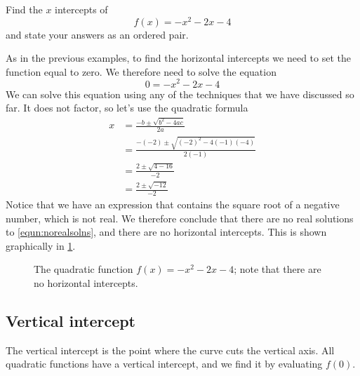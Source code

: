 \begin{myexample}\label{ex:horizints3}
Find the $x$ intercepts of 
\[
	f(x) = -x^2-2x-4
\]
and state your answers as an ordered pair.
\end{myexample}
\begin{myProof}
	As in the previous examples, to find the horizontal intercepts we need to set the function equal to zero. 
	We therefore need to solve the equation
	\begin{equation}\label{equn:norealsolns}
		0 = -x^2-2x-4
	\end{equation}
	We can solve this equation using any of the techniques that we have discussed so far. It does not
	\gls{factor}, so let's use the quadratic formula
	\begin{align*}
		x & =   \frac{-b\pm \sqrt{b^2-4ac}}{2a}                \\
		  & =   \frac{-(-2)\pm \sqrt{(-2)^2-4(-1)(-4)}}{2(-1)} \\
		  & =  \frac{2\pm\sqrt{4-16}}{-2}                      \\
		  & =  \frac{2\pm \sqrt{-12}}{-2}                      
	\end{align*} 
	{}
	Notice that we have an expression that contains the square root of a negative number, which is not real. 
	We therefore conclude that there are no real solutions to \cref{equn:norealsolns}, and there
	are no horizontal intercepts. This is shown graphically in \cref{fig:quad2}.
			
	\begin{figure}[!ht]
		\centering
		\caption{The quadratic function $f(x)=-x^2-2x-4$; note that there are no horizontal intercepts.}
		\label{fig:quad2}
	\end{figure}
	{}
	\FloatBarrier
\end{myProof}


\subsection{Vertical intercept}
The vertical intercept is the point where the curve cuts the vertical axis. All quadratic functions have a vertical
intercept, and we find it by evaluating $f(0)$.

